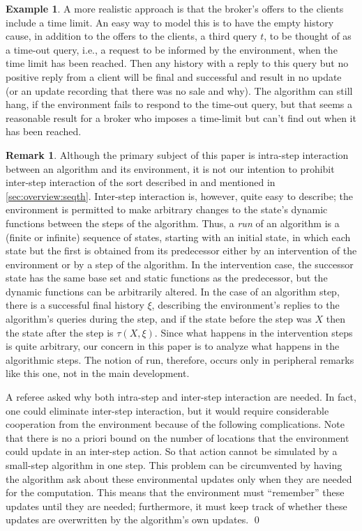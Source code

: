 \documentclass{LMCS}
\theoremstyle{definition}
\newtheorem{ex}[thm]{Example}
\newtheorem{rmk}[thm]{Remark}
\begin{document}
\begin{ex}
A more realistic approach is that the broker's offers to the clients
include a time limit.  An easy way to model this is to have the empty
history cause, in addition to the offers to the clients, a third query
$t$, to be thought of as a time-out query, i.e., a request to be
informed by the environment, when the time limit has been reached.
Then any history with a reply to this query but no positive reply from
a client will be final and successful and result in no update (or an
update recording that there was no sale and why).  The algorithm can
still hang, if the environment fails to respond to the time-out query,
but that seems a reasonable result for a broker who imposes a
time-limit but can't find out when it has been reached.
\end{ex}

\begin{rmk}
  Although the primary subject of this paper is intra-step interaction
  between an algorithm and its environment, it is not our intention to
  prohibit inter-step interaction of the sort described in \cite{lipari}
  and mentioned in \ref{sec:overview:seqth}.  Inter-step interaction is,
  however, quite easy to describe; the environment is permitted to make
  arbitrary changes to the state's dynamic functions between the steps of
  the algorithm. Thus, a \emph{run} of an algorithm is a (finite or
  infinite) sequence of states, starting with an initial state, in which
  each state but the first is obtained from its predecessor either by an
  intervention of the environment or by a step of the algorithm.  In the
  intervention case, the successor state has the same base set and static
  functions as the predecessor, but the dynamic functions can be
  arbitrarily altered.  In the case of an algorithm step, there is a
  successful final history $\xi$, describing the environment's replies to
  the algorithm's queries during the step, and if the state before the
  step was $X$ then the state after the step is $\tau(X,\xi)$.  Since what
  happens in the intervention steps is quite arbitrary, our concern in
  this paper is to analyze what happens in the algorithmic steps.  The
  notion of run, therefore, occurs only in peripheral remarks like this
  one, not in the main development.

  A referee asked why both intra-step and inter-step interaction are
  needed.  In fact, one could eliminate inter-step interaction, but it
  would require considerable cooperation from the environment because
  of the following complications.  Note that there is no a priori
  bound on the number of locations that the environment could update
  in an inter-step action.  So that action cannot be simulated by a
  small-step algorithm in one step.  This problem can be circumvented
  by having the algorithm ask about these environmental updates only
  when they are needed for the computation.  This means that the
  environment must ``remember'' these updates until they are needed;
  furthermore, it must keep track of whether these updates are
  overwritten by the algorithm's own updates.  \qed\end{rmk}
\end{document}
